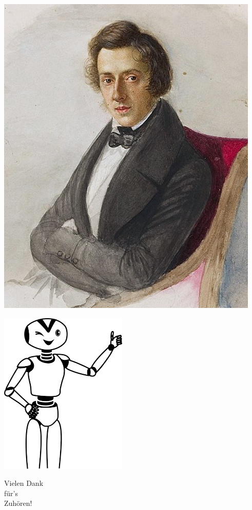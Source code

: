 \documentclass[aspectratio=43,x11names]{beamer}
\begin{document}
\begin{frame}[fragile]
\begin{minipage}{0.45\textwidth}
\begin{center}
\includegraphics[width=\textwidth, keepaspectratio]{images/chopin} 
\end{center}
\end{minipage}
\end{frame}



\begin{frame}[fragile]
\begin{multicols}{2}

\vspace*{73pt}
\includegraphics[scale=0.6]{images/Happy-Thumbs-Up-Robot.png} 

\columnbreak

\vspace*{40pt}

\Huge
\hspace*{-30pt}Vielen Dank\\ für's\\ Zuhören!
\end{multicols}
\end{frame}
\end{document}

